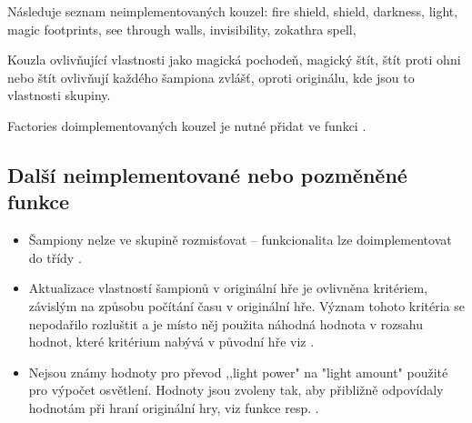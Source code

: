 Následuje seznam neimplementovaných kouzel: fire shield, shield, darkness, light, magic footprints,
see through walls, invisibility, zokathra spell,

Kouzla ovlivňující vlastnosti jako magická pochodeň, magický štít, štít proti ohni nebo štít ovlivňují každého šampiona
zvlášť, oproti originálu, kde jsou to vlastnosti skupiny.

Factories doimplementovaných kouzel je nutné přidat ve funkci .
               

\subsection{Další neimplementované nebo pozměněné funkce}
\begin{itemize}
\item Šampiony nelze ve skupině rozmisťovat -- funkcionalita lze doimplementovat do třídy .
\item Aktualizace vlastností šampionů v originální hře je ovlivněna kritériem, závislým na způsobu počítání času v originální hře.
	Význam tohoto kritéria se nepodařilo rozluštit a je místo něj použita náhodná hodnota v rozsahu hodnot, které kritérium 
	nabývá v původní hře viz \newline {}.
\item Nejsou známy hodnoty pro převod ,,light power" na "light amount" použité pro výpočet osvětlení. Hodnoty 
jsou zvoleny tak, aby přibližně odpovídaly hodnotám při hraní originální hry, viz funkce 
\newline resp. .
\end{itemize}